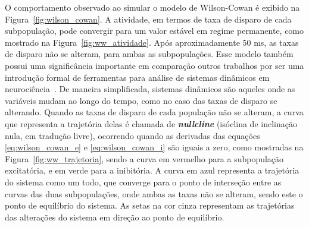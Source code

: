 O comportamento observado ao simular o modelo de Wilson-Cowan é exibido na Figura~\ref{fig:wilson_cowan}. A atividade, em termos de taxa de disparo de cada subpopulação, pode convergir para um valor estável em regime permanente, como mostrado na Figura~\ref{fig:ww_atividade}. Após aproximadamente 50 ms, as taxas de disparo não se alteram, para ambas as subpopulações. Esse modelo também possui uma significância importante em comparação  outros trabalhos por ser uma introdução formal de ferramentas para análise de sistemas dinâmicos em neurociência~\cite{ramezanian-panahi_generative_2022}. De maneira simplificada, sistemas dinâmicos são aqueles onde as variáveis mudam ao longo do tempo, como no caso das taxas de disparo se alterando. Quando as taxas de disparo de cada população não se alteram, a curva que representa a trajetória delas é chamada de \textbf{\textit{nullcline}} (isóclina de inclinação nula, em tradução livre), ocorrendo quando as derivadas das equações \ref{eq:wilson_cowan_e} e \ref{eq:wilson_cowan_i} são iguais a zero, como mostradas na Figura~\ref{fig:ww_trajetoria}, sendo a curva em vermelho para a subpopulação excitatória, e em verde para a inibitória. A curva em azul representa a trajetória do sistema como um todo, que converge para o ponto de interseção entre as curvas das duas subpopulações, onde ambas as taxas não se alteram, sendo este o ponto de equilíbrio do sistema. As setas na cor cinza representam as trajetórias das alterações do sistema em direção ao ponto de equilíbrio.
